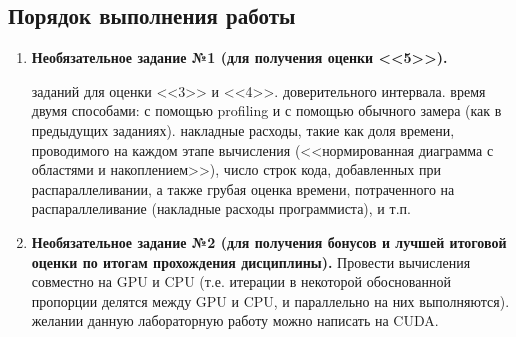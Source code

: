 \subsection{Порядок выполнения работы}

\begin{enumerate}
     необходимо реализовать один (для оценки <<3>>) или два (для оценки <<4>>) этапа вашей программы из предыдущих лабораторных работ. При этом вычисления можно проводить как на CPU, так и на GPU (на своё усмотрение, но GPU предпочтительнее).
    \item\textbf{Необязательное задание №1 (для получения оценки <<5>>).}
        \begin{itemize}
             заданий для оценки <<3>> и <<4>>.
             доверительного интервала. 
             время двумя способами: с помощью profiling и с помощью обычного замера (как в предыдущих заданиях).
             накладные расходы, такие как доля времени, проводимого на каждом этапе вычисления (<<нормированная диаграмма с областями и накоплением>>), число строк кода, добавленных при распараллеливании, а также грубая оценка времени, потраченного на распараллеливание (накладные расходы программиста), и т.п.
        \end{itemize}
    \item\textbf{Необязательное задание №2 (для получения бонусов и лучшей итоговой оценки по итогам прохождения дисциплины).} Провести вычисления совместно на GPU и CPU (т.е. итерации в некоторой обоснованной пропорции делятся между GPU и CPU, и параллельно на них выполняются).
     желании данную лабораторную работу можно написать на CUDA.
\end{enumerate}

